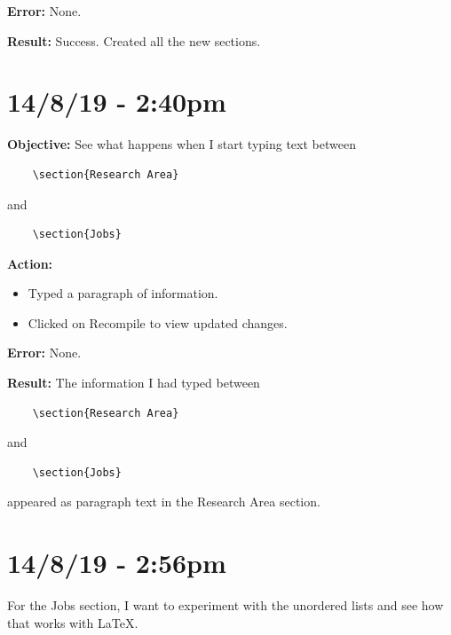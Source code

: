 \documentclass{article}
\begin{document}
\textbf{Error:} None.

\textbf{Result:} Success. Created all the new sections.

\section*{14/8/19 - 2:40pm}

\textbf{Objective:} See what happens when I start typing text between \begin{verbatim}
    \section{Research Area}
\end{verbatim}
and
\begin{verbatim}
    \section{Jobs}
\end{verbatim}

\textbf{Action:}
\begin{itemize}
    \item Typed a paragraph of information.
    \item Clicked on Recompile to view updated changes.
\end{itemize}

\textbf{Error:} None.

\textbf{Result:} The information I had typed between \begin{verbatim}
    \section{Research Area}
\end{verbatim}
and
\begin{verbatim}
    \section{Jobs} 
\end{verbatim}
appeared as paragraph text in the Research Area section.

\section*{14/8/19 - 2:56pm}

For the Jobs section, I want to experiment with the unordered lists and see how that works with LaTeX. 
\end{document}
